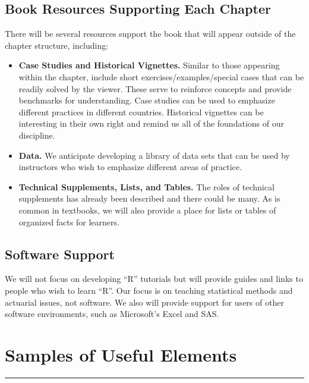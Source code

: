 \documentclass[]{book}
\providecommand{\tightlist}{%
  \setlength{\itemsep}{0pt}\setlength{\parskip}{0pt}}
\theoremstyle{definition}
\theoremstyle{definition}
\theoremstyle{definition}
\theoremstyle{remark}
\begin{document}
\subsection{Book Resources Supporting Each
Chapter}\label{book-resources-supporting-each-chapter}

There will be several resources support the book that will appear
outside of the chapter structure, including:

\begin{itemize}
\tightlist
\item
  \textbf{Case Studies and Historical Vignettes.} Similar to those
  appearing within the chapter, include short exercises/examples/special
  cases that can be readily solved by the viewer. These serve to
  reinforce concepts and provide benchmarks for understanding. Case
  studies can be used to emphasize different practices in different
  countries. Historical vignettes can be interesting in their own right
  and remind us all of the foundations of our discipline.
\item
  \textbf{Data.} We anticipate developing a library of data sets that
  can be used by instructors who wish to emphasize different areas of
  practice.
\item
  \textbf{Technical Supplements, Lists, and Tables.} The roles of
  technical supplements has already been described and there could be
  many. As is common in textbooks, we will also provide a place for
  lists or tables of organized facts for learners.
\end{itemize}

\subsection{Software Support}\label{software-support}

We will not focus on developing ``R'' tutorials but will provide guides
and links to people who wish to learn ``R''. Our focus is on teaching
statistical methods and actuarial issues, not software. We also will
provide support for users of other software environments, such as
Microsoft's Excel and SAS.

\section{Samples of Useful Elements}\label{S:SampleSection}

\begin{center}\rule{0.5\linewidth}{\linethickness}\end{center}
\end{document}
